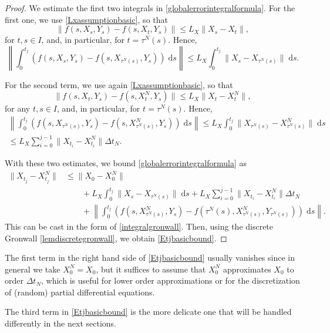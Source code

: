 \documentclass[reqno,12pt]{amsart}
\theoremstyle{plain} %
\theoremstyle{definition} %
\begin{document}
\begin{proof}
    We estimate the first two integrals in \eqref{globalerrorintegralformula}. For the first one, we use \eqref{Lxassumptionbasic}, so that
    $$
        \|f(s, X_s, Y_s) - f(s, X_t, Y_s)\| \leq L_X \|X_s - X_t\|,
    $$
    for $t, s \in I$, and, in particular, for $t = \tau^N(s)$. Hence,
    $$
        \left\|\int_0^{t_j} \left( f(s, X_s, Y_s) - f(s, X_{\tau^N(s)}, Y_s) \right)\;\mathrm{d}s \right\| \leq L_X \int_0^{t_j} \|X_s - X_{\tau^N(s)}\| \;\mathrm{d}s.
    $$
    
    For the second term, we use again \eqref{Lxassumptionbasic}, so that
    $$
        \|f(s, X_t, Y_s) - f(s, X_t^N, Y_s)\| \leq L_X \|X_t - X_t^N\|,
    $$
    for any $t, s \in I$, and, in particular, for $t = \tau^N(s)$. Hence,
    \begin{multline*}
        \left\|\int_0^{t_j} \left( f(s, X_{\tau^N(s)}, Y_s) - f(s, X_{\tau^N(s)}^N, Y_s) \right)\;\mathrm{d}s \right\| \leq L_X \int_0^{t_j} \|X_{\tau^N(s)} - X_{\tau^N(s)}^N\| \;\mathrm{d}s \\
        \leq L_X\sum_{i=0}^{j-1} \|X_{t_i} - X_{t_i}^N\|\Delta t_N.
    \end{multline*}
    
    With these two estimates, we bound \eqref{globalerrorintegralformula} as
    \begin{align*}
        \|X_{t_j} - X_{t_j}^N\| & \leq \|X_0 - X_0^N\| \\
        & \qquad + L_X \int_0^{t_j} \|X_s - X_{\tau^N(s)}\| \;\mathrm{d}s + L_X\sum_{i=0}^{j-1} \|X_{t_i} - X_{t_i}^N\|\Delta t_N \\
        & \qquad + \left\|\int_0^{t_j} \left( f(s, X_{\tau^N(s)}^N, Y_s) - f(\tau^N(s), X_{\tau^N(s)}^N, Y_{\tau^N(s)}) \right)\;\mathrm{d}s\right\|.
    \end{align*}
    This can be cast in the form of \eqref{integralgronwall}. Then, using the discrete Gronwall \cref{lemdiscretegronwall}, we obtain \eqref{Etjbasicbound}.
\end{proof}

The first term in the right hand side of \eqref{Etjbasicbound} usually vanishes since in general we take $X_0^N = X_0$, but it suffices to assume that $X_0^N$ approximates $X_0$ to order $\Delta t_N$, which is useful for lower order approximations or for the discretization of (random) partial differential equations.

The third term in \eqref{Etjbasicbound} is the more delicate one that will be handled differently in the next sections.
\end{document}
